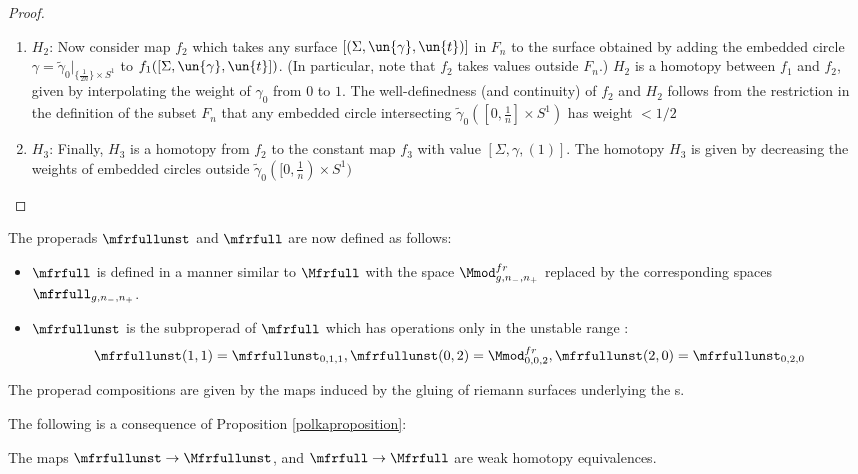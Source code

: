 \documentclass[a4paper,10pt]{amsart}
\begin{document}
\begin{proof}
\begin{enumerate}
		\item $H_2$: Now consider map $f_{2}$ which takes any surface $[(\Sigma,\un{\gamma},\un{t})]$ in $F_n$ to the surface obtained by adding the embedded circle $\gamma = \widetilde{\gamma}_0|_{\{\frac{1}{2n}\} \times S^1}$ to $f_1([\Sigma,\un{\gamma},\un{t}])$. (In particular, note that $f_2$ takes values outside $F_n$.) $H_2$ is a homotopy between $f_1$ and $f_2$, given by interpolating the weight of $\gamma_0$ from $0$ to $1$. The well-definedness (and continuity) of $f_2$ and $H_2$ follows from the restriction in the definition of the subset $F_n$ that any embedded circle intersecting $\widetilde{\gamma}_0([0,\frac{1}{n}] \times S^1)$ has weight $< 1/2$
		\item $H_3$: Finally, $H_3$ is a homotopy from $f_2$ to the constant map $f_3$ with value $[\Sigma,\gamma,(1)]$. The homotopy $H_3$ is given by decreasing the weights of embedded circles outside $\widetilde{\gamma}_0([0,\frac{1}{n}) \times S^1)$
	\end{enumerate}
\end{proof}	
	

The properads $\mfrfullunst$ and $\mfrfull$ are now defined as follows:
\begin{itemize}
	\item $\mfrfull$ is defined in a manner similar to $\Mfrfull$ with the space $\Mmod^{fr}_{g,n_-,n_+}$ replaced by the corresponding spaces $\mfrfull_{g,n_-,n_+}$.
	
	\item $\mfrfullunst$ is the subproperad of $\mfrfull$ which has operations only in the unstable range :
	\[\mfrfullunst(1,1) =\mfrfullunst_{0,1,1}, \mfrfullunst(0,2) = \Mmod^{fr}_{0,0,2},\mfrfullunst(2,0)=\mfrfullunst_{0,2,0} \]
\end{itemize}		



The properad compositions are given by the maps induced by the gluing of riemann surfaces underlying the {\splitsurface}s.

The following is a consequence of Proposition \ref{polkaproposition}:
\begin{corollary}
The maps $\mfrfullunst \to \Mfrfullunst$, and $\mfrfull \to \Mfrfull$ are weak homotopy equivalences.
\end{corollary}

\end{document}
